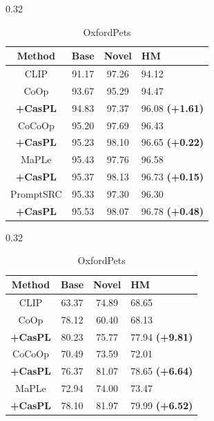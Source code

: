 \documentclass[runningheads]{llncs}
\newcommand{\improve}[1]{\textcolor{boost_line}{\textbf{#1}}}
\begin{document}
{{\begin{table}[!t]
    \begin{subtable}[t]{0.32\linewidth}
        \resizebox{0.96\linewidth}{!}
        {
        \begin{tabular}{c|ccl}
            \hline
            Method    & Base  & Novel & HM \\
            \hline
            CLIP & 91.17 & 97.26 & 94.12 \\
            \hline
            CoOp & 93.67 & 95.29 & 94.47 \\
            \rowcolor{tablecolor} \textbf{+CasPL} &94.83 	&97.37 	&96.08    \improve{(+1.61)}  \\
            \hline
            CoCoOp & 95.20 & 97.69 & 96.43 \\
            \rowcolor{tablecolor} \textbf{+CasPL} &95.23 	&98.10 	&96.65   \improve{(+0.22)}  \\
            \hline
            MaPLe & 95.43 & 97.76 & 96.58 \\
            \rowcolor{tablecolor} \textbf{+CasPL} &95.37 	&98.13 	&96.73  \improve{(+0.15)}  \\
            \hline
            PromptSRC & 95.33 & 97.30 & 96.30 \\
            \rowcolor{tablecolor} \textbf{+CasPL} &95.53 	&98.07 	&96.78  \improve{(+0.48)}  \\
            \hline
        \end{tabular}
        }
        \caption{OxfordPets}
    \end{subtable}
    \begin{subtable}[t]{0.32\linewidth}
        \resizebox{0.96\linewidth}{!}
        {
        \begin{tabular}{c|ccl}
            \hline
            Method    & Base  & Novel & HM \\
            \hline
            CLIP & 63.37 & 74.89 & 68.65 \\
            \hline
            CoOp & 78.12 & 60.40 & 68.13 \\
            \rowcolor{tablecolor} \textbf{+CasPL} &80.23 	&75.77 	&77.94    \improve{(+9.81)}  \\
            \hline
            CoCoOp & 70.49 & 73.59 & 72.01 \\
            \rowcolor{tablecolor} \textbf{+CasPL} &76.37 	&81.07 	&78.65   \improve{(+6.64)}  \\
            \hline
            MaPLe & 72.94 & 74.00 & 73.47 \\
            \rowcolor{tablecolor} \textbf{+CasPL} &78.10 	&81.97 	&79.99  \improve{(+6.52)} \\

\end{tabular}}
\end{subtable}
\end{table}}}
\end{document}
